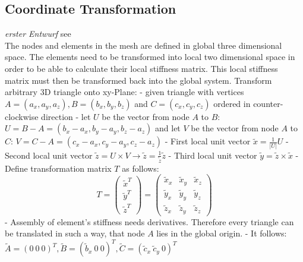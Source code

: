 \documentclass[11pt,twoside]{scrartcl}
\begin{document}
 \subsection{Coordinate Transformation} %
 \textit{erster Entwurf}\newline
 see \cite{nguyen2008smoothed}\\
 The nodes and elements in the mesh are defined in global three dimensional space. The elements need to be transformed into local two dimensional space in order to be able to calculate their local stiffness matrix. This local stiffness matrix must then be transformed back into the global system.
 Transform arbitrary 3D triangle onto xy-Plane:
 - given triangle with vertices $A=(a_x, a_y, a_z), B=(b_x, b_y, b_z)$ and $C=(c_x, c_y, c_z)$ ordered in counter-clockwise direction\newline
 - let $U$ be the vector from node $A$ to $B$: $U = B-A = (b_x-a_x, b_y-a_y,b_z-a_z)$ and let $V$ be the vector from node $A$ to $C$: $V = C-A = (c_x-a_x,c_y-a_y,c_z-a_z)$\newline
 - First local unit vector $\tilde{x} = \frac{1}{\left|U\right|}U$\newline
 - Second local unit vector $\tilde{z} = U \times V \longrightarrow \tilde{z} = \frac{1}{\tilde{z}}\tilde{z}$\newline
 - Third local unit vector $\tilde{y} = \tilde{z} \times \tilde{x}$\newline
 - Define transformation matrix $T$ as follows: \[T = \begin{pmatrix}
 \tilde{x}^T\\ \tilde{y}^T\\ \tilde{z}^T
 \end{pmatrix}
 = \begin{pmatrix}
  \tilde{x}_x & \tilde{x}_y & \tilde{x}_z\\ \tilde{y}_x & \tilde{y}_y & \tilde{y}_z\\ \tilde{z}_x & \tilde{z}_y & \tilde{z}_z
  \end{pmatrix}\]
  - Assembly of element's stiffness needs derivatives. Therefore every triangle can be translated in such a way, that node $A$ lies in the global origin.\newline
  - It follows: $\tilde{A} = \left(0\ 0\ 0\right)^T, \tilde{B} = \left(\tilde{b}_x\ 0\ 0\right)^T, \tilde{C} = \left(\tilde{c}_x\ \tilde{c}_y\ 0\right)^T$\newline
\end{document}
